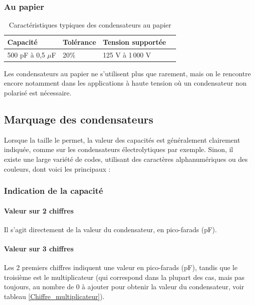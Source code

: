 \documentclass[a4paper]{article}
\begin{document}
\subsubsection{Au papier}

\begin{table}[H]
	\centering
		\begin{tabular}{|l|l|l|l|}\hline
				Capacité & Tolérance & Tension supportée\\\hline
				500 pF à 0,5 $\mu$F & 20\% & 125 V à 1\,000 V\\\hline
		\end{tabular}
		\caption{Caractéristiques typiques des condensateurs au papier
			\label{Caracteristiques_des_condensateurs_au_papier}}
\end{table}

Les condensateurs au papier ne s'utilisent plus que rarement, mais on le rencontre encore notamment dans les applications à haute tension où un condensateur non polarisé est nécessaire.

\subsection{Marquage des condensateurs}

Lorsque la taille le permet, la valeur des capacités est généralement clairement indiquée, comme sur les condensateurs électrolytiques par exemple. Sinon, il existe une large variété de codes, utilisant des caractères alphanumériques ou des couleurs, dont voici les principaux :

\subsubsection{Indication de la capacité}

\paragraph{Valeur sur 2 chiffres}

Il s'agit directement de la valeur du condensateur, en pico-farads (pF).

\paragraph{Valeur sur 3 chiffres}

Les 2 premiers chiffres indiquent une valeur en pico-farads (pF), tandis que le troisième est le multiplicateur (qui correspond dans la plupart des cas, mais pas toujours, au nombre de 0 à ajouter pour obtenir la valeur du condensateur, voir tableau \ref{Chiffre_multiplicateur}).
\end{document}
